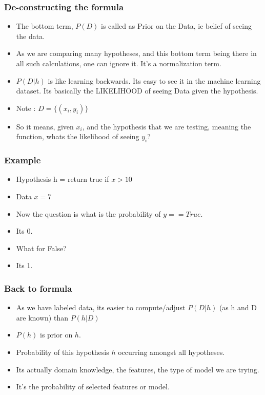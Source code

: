 \begin{frame}[fragile]\frametitle{De-constructing the formula}

\begin{itemize}
\item The bottom term, $P(D)$ is called as Prior on the Data, ie belief of seeing the data. 
\item As we are comparing many hypotheses, and this bottom term being there in all such calculations, one can ignore it. It’s a normalization term.
\item $P(D|h)$ is like learning backwards. Its easy to see it in the machine learning dataset. Its basically the LIKELIHOOD of seeing Data given the hypothesis.
\item Note : $D = \{(x_i, y_i)\}$
\item So it means, given $x_i$, and the hypothesis that we are testing, meaning the function, whats the likelihood of seeing $y_i$?

\end{itemize}

\end{frame}

\begin{frame}[fragile]\frametitle{Example}

\begin{itemize}
\item Hypothesis h = return true if $x > 10$
\item Data $x = 7$
\item Now the question is what is the probability of $y == True$. 
\item Its 0. 
\item What for False? 
\item Its 1.


\end{itemize}

\end{frame}

\begin{frame}[fragile]\frametitle{Back to formula}

\begin{itemize}
\item As we have labeled data, its easier to compute/adjust $P(D|h)$ (as h and D are known) than $P(h|D)$
\item $P(h)$ is prior on $h$. 
\item Probability of this hypothesis $h$ occurring amongst all hypotheses. 
\item Its actually domain knowledge, the features, the type of model we are trying. 
\item It’s the probability of selected features or model.
\end{itemize}

\end{frame}



